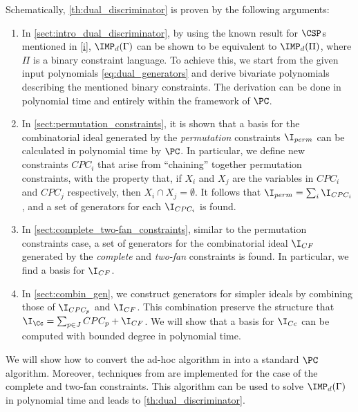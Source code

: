 \documentclass[11pt]{article}
\begin{document}
{Schematically, \cref{th:dual_discriminator} is proven by the following arguments:}
%
\begin{enumerate}
    \item In \cref{sect:intro_dual_discriminator}, by using the known result for $\CSP$s mentioned in \ref{i}, $\IMP_d(\Gamma)$ can be shown to be equivalent to $\IMP_{d}(\Pi)$, where $\Pi$ is a binary constraint language. To achieve this, we start from the given input polynomials \eqref{eq:dual_generators} and derive bivariate polynomials describing the mentioned binary constraints. The derivation can be done in polynomial time and entirely within the framework of $\PC$. 
    \item In \cref{sect:permutation_constraints}, it is shown that a \GB basis for the combinatorial ideal generated by the \textit{permutation} constraints $\I_{perm}$ can be calculated in polynomial time by $\PC$. In particular, we define new constraints $CPC_i$ that arise from ``chaining'' together permutation constraints, with the property that, if $X_i$ and $X_j$ are the variables in $CPC_i$ and $CPC_j$ respectively, then $X_i \cap X_j = \emptyset$. It follows that $\I_{perm} = \sum_i \I_{CPC_i}$, and a set of generators for each $\I_{CPC_i}$ is found.
    \item In \cref{sect:complete_two-fan_constraints}, similar to the permutation constraints case, a set of generators for the combinatorial ideal $\I_{CF}$ generated by the \textit{complete} and \textit{two-fan} constraints is found. In particular, we find a \GB basis for $\I_{CF}$.
    \item In \cref{sect:combin_gen}, we construct generators for simpler ideals by combining those of $\I_{CPC_p}$ and $\I_{CF}$. This combination preserve the structure that $\I_{\Cc} = \sum_{p \in J} CPC_p + \I_{CF}$. We will show that a \GB basis for $\I_{Cc}$ can be computed with bounded degree in polynomial time.
\end{enumerate}

We will show how to convert the ad-hoc algorithm in \cite{BharathiM21, BharathiM25} into a standard $\PC$ algorithm. Moreover, techniques from \cite{BulatovRSTOC22} are implemented for the case of the complete and two-fan constraints. This algorithm can be used to solve $\IMP_d(\Gamma)$ in polynomial time and leads to \cref{th:dual_discriminator}.
\end{document}
